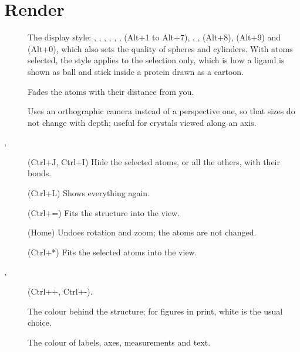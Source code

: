 \section{Render}
\begin{description}
	\item[] The display style: , , , , , ,  (\textsf{Alt+1} to \textsf{Alt+7}), , ,  (\textsf{Alt+8}),  (\textsf{Alt+9}) and  (\textsf{Alt+0}), which also sets the quality of spheres and cylinders. With atoms selected, the style applies to the selection only, which is how a ligand is shown as ball and stick inside a protein drawn as a cartoon.
	\item[] Fades the atoms with their distance from you.
	\item[] Uses an orthographic camera instead of a perspective one, so that sizes do not change with depth; useful for crystals viewed along an axis.
	\item[, ] (\textsf{Ctrl+J}, \textsf{Ctrl+I}) Hide the selected atoms, or all the others, with their bonds.
	\item[] (\textsf{Ctrl+L}) Shows everything again.
	\item[] (\textsf{Ctrl+=}) Fits the structure into the view.
	\item[] (\textsf{Home}) Undoes rotation and zoom; the atoms are not changed.
	\item[] (\textsf{Ctrl+*}) Fits the selected atoms into the view.
	\item[, ] (\textsf{Ctrl++}, \textsf{Ctrl+-}).
	\item[] The colour behind the structure; for figures in print, white is the usual choice.
	\item[] The colour of labels, axes, measurements and text.
\end{description}


